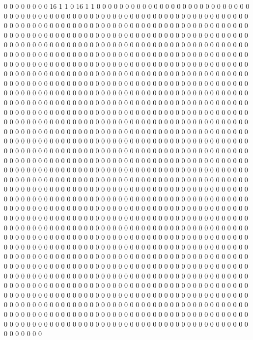0
0
0
0
0
0
0
0
16
1
1
0
16
1
1
0
0
0
0
0
0
0
0
0
0
0
0
0
0
0
0
0
0
0
0
0
0
0
0
0
0
0
0
0
0
0
0
0
0
0
0
0
0
0
0
0
0
0
0
0
0
0
0
0
0
0
0
0
0
0
0
0
0
0
0
0
0
0
0
0
0
0
0
0
0
0
0
0
0
0
0
0
0
0
0
0
0
0
0
0
0
0
0
0
0
0
0
0
0
0
0
0
0
0
0
0
0
0
0
0
0
0
0
0
0
0
0
0
0
0
0
0
0
0
0
0
0
0
0
0
0
0
0
0
0
0
0
0
0
0
0
0
0
0
0
0
0
0
0
0
0
0
0
0
0
0
0
0
0
0
0
0
0
0
0
0
0
0
0
0
0
0
0
0
0
0
0
0
0
0
0
0
0
0
0
0
0
0
0
0
0
0
0
0
0
0
0
0
0
0
0
0
0
0
0
0
0
0
0
0
0
0
0
0
0
0
0
0
0
0
0
0
0
0
0
0
0
0
0
0
0
0
0
0
0
0
0
0
0
0
0
0
0
0
0
0
0
0
0
0
0
0
0
0
0
0
0
0
0
0
0
0
0
0
0
0
0
0
0
0
0
0
0
0
0
0
0
0
0
0
0
0
0
0
0
0
0
0
0
0
0
0
0
0
0
0
0
0
0
0
0
0
0
0
0
0
0
0
0
0
0
0
0
0
0
0
0
0
0
0
0
0
0
0
0
0
0
0
0
0
0
0
0
0
0
0
0
0
0
0
0
0
0
0
0
0
0
0
0
0
0
0
0
0
0
0
0
0
0
0
0
0
0
0
0
0
0
0
0
0
0
0
0
0
0
0
0
0
0
0
0
0
0
0
0
0
0
0
0
0
0
0
0
0
0
0
0
0
0
0
0
0
0
0
0
0
0
0
0
0
0
0
0
0
0
0
0
0
0
0
0
0
0
0
0
0
0
0
0
0
0
0
0
0
0
0
0
0
0
0
0
0
0
0
0
0
0
0
0
0
0
0
0
0
0
0
0
0
0
0
0
0
0
0
0
0
0
0
0
0
0
0
0
0
0
0
0
0
0
0
0
0
0
0
0
0
0
0
0
0
0
0
0
0
0
0
0
0
0
0
0
0
0
0
0
0
0
0
0
0
0
0
0
0
0
0
0
0
0
0
0
0
0
0
0
0
0
0
0
0
0
0
0
0
0
0
0
0
0
0
0
0
0
0
0
0
0
0
0
0
0
0
0
0
0
0
0
0
0
0
0
0
0
0
0
0
0
0
0
0
0
0
0
0
0
0
0
0
0
0
0
0
0
0
0
0
0
0
0
0
0
0
0
0
0
0
0
0
0
0
0
0
0
0
0
0
0
0
0
0
0
0
0
0
0
0
0
0
0
0
0
0
0
0
0
0
0
0
0
0
0
0
0
0
0
0
0
0
0
0
0
0
0
0
0
0
0
0
0
0
0
0
0
0
0
0
0
0
0
0
0
0
0
0
0
0
0
0
0
0
0
0
0
0
0
0
0
0
0
0
0
0
0
0
0
0
0
0
0
0
0
0
0
0
0
0
0
0
0
0
0
0
0
0
0
0
0
0
0
0
0
0
0
0
0
0
0
0
0
0
0
0
0
0
0
0
0
0
0
0
0
0
0
0
0
0
0
0
0
0
0
0
0
0
0
0
0
0
0
0
0
0
0
0
0
0
0
0
0
0
0
0
0
0
0
0
0
0
0
0
0
0
0
0
0
0
0
0
0
0
0
0
0
0
0
0
0
0
0
0
0
0
0
0
0
0
0
0
0
0
0
0
0
0
0
0
0
0
0
0
0
0
0
0
0
0
0
0
0
0
0
0
0
0
0
0
0
0
0
0
0
0
0
0
0
0
0
0
0
0
0
0
0
0
0
0
0
0
0
0
0
0
0
0
0
0
0
0
0
0
0
0
0
0
0
0
0
0
0
0
0
0
0
0
0
0
0
0
0
0
0
0
0
0
0
0
0
0
0
0
0
0
0
0
0
0
0
0
0
0
0
0
0
0
0
0
0
0
0
0
0
0
0
0
0
0
0
0
0
0
0
0
0
0
0
0
0
0
0
0
0
0
0
0
0
0
0
0
0
0
0
0
0
0
0
0
0
0
0
0
0
0
0
0
0
0
0
0
0
0
0
0
0
0
0
0
0
0
0
0
0
0
0
0
0
0
0
0
0
0
0
0
0
0
0
0
0
0
0
0
0
0
0
0
0
0
0
0
0
0
0
0
0
0
0
0
0
0
0
0
0
0
0
0
0
0
0
0
0
0
0
0
0
0
0
0
0
0
0
0
0
0
0
0
0
0
0
0
0
0
0
0
0
0
0
0
0
0
0
0
0
0
0
0
0
0
0
0
0
0
0
0
0
0
0
0
0
0
0
0
0
0
0
0
0
0
0
0
0
0
0
0
0
0
0
0
0
0
0
0
0
0
0
0
0
0
0
0
0
0
0
0
0
0
0
0
0
0
0
0
0
0
0
0
0
0
0
0
0
0
0
0
0
0
0
0
0
0
0
0
0
0
0
0
0
0
0
0
0
0
0
0
0
0
0
0
0
0
0
0
0
0
0
0
0
0
0
0
0
0
0
0
0
0
0
0
0
0
0
0
0
0
0
0
0
0
0
0
0
0
0
0
0
0
0
0
0
0
0
0
0
0
0
0
0
0
0
0
0
0
0
0
0
0
0
0
0
0
0
0
0
0
0
0
0
0
0
0
0
0
0
0
0
0
0
0
0
0
0
0
0
0
0
0
0
0
0
0
0
0
0
0
0
0
0
0
0
0
0
0
0
0
0
0
0
0
0
0
0
0
0
0
0
0
0
0
0
0
0
0
0
0
0
0
0
0
0
0
0
0
0
0
0
0
0
0
0
0
0
0
0
0
0
0
0
0
0
0
0
0
0
0
0
0
0
0
0
0
0
0
0
0
0
0
0
0
0
0
0
0
0
0
0
0
0
0
0
0
0
0
0
0
0
0
0
0
0
0
0
0
0
0
0
0
0
0
0
0
0
0
0
0
0
0
0
0
0
0
0
0
0
0
0
0
0
0
0
0
0
0
0
0
0
0
0
0
0
0
0
0
0
0
0
0
0
0
0
0
0
0
0
0
0
0
0
0
0
0
0
0
0
0
0
0
0
0
0
0
0
0
0
0
0
0
0
0
0
0
0
0
0
0
0
0
0
0
0
0
0
0
0
0
0
0
0
0
0
0
0
0
0
0
0
0
0
0
0
0
0
0
0
0
0
0
0
0
0
0
